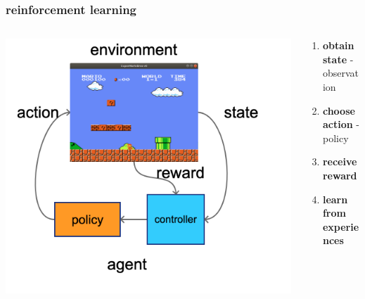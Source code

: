 \documentclass{beamer}
\begin{document}
\begin{frame}
\frametitle{reinforcement learning}
  
  \begin{columns}
  
    \begin{column}{0.5\textwidth}
      \includegraphics[scale=0.15]{../diagrams/basic/reinforcementlearning.png}
    \end{column}
  
    \begin{column}{0.5\textwidth}
      \begin{enumerate}
        \item {\bf obtain state} - observation
        \item {\bf choose action} - policy
        \item {\bf receive reward}
        \item {\bf learn from experiences}
      \end{enumerate}
    \end{column}
  
  \end{columns}
  
\end{frame}
\end{document}
